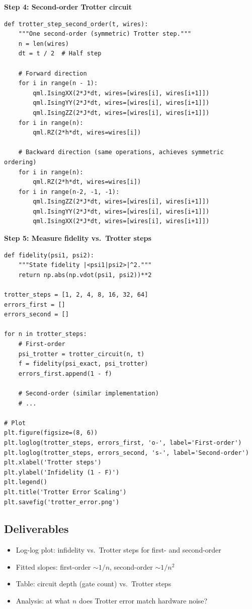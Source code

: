 \documentclass[11pt,a4paper]{article}
\begin{document}
\textbf{Step 4: Second-order Trotter circuit}
\begin{lstlisting}
def trotter_step_second_order(t, wires):
    """One second-order (symmetric) Trotter step."""
    n = len(wires)
    dt = t / 2  # Half step
    
    # Forward direction
    for i in range(n - 1):
        qml.IsingXX(2*J*dt, wires=[wires[i], wires[i+1]])
        qml.IsingYY(2*J*dt, wires=[wires[i], wires[i+1]])
        qml.IsingZZ(2*J*dt, wires=[wires[i], wires[i+1]])
    for i in range(n):
        qml.RZ(2*h*dt, wires=wires[i])
    
    # Backward direction (same operations, achieves symmetric ordering)
    for i in range(n):
        qml.RZ(2*h*dt, wires=wires[i])
    for i in range(n-2, -1, -1):
        qml.IsingZZ(2*J*dt, wires=[wires[i], wires[i+1]])
        qml.IsingYY(2*J*dt, wires=[wires[i], wires[i+1]])
        qml.IsingXX(2*J*dt, wires=[wires[i], wires[i+1]])
\end{lstlisting}

\textbf{Step 5: Measure fidelity vs.\ Trotter steps}
\begin{lstlisting}
def fidelity(psi1, psi2):
    """State fidelity |<psi1|psi2>|^2."""
    return np.abs(np.vdot(psi1, psi2))**2

trotter_steps = [1, 2, 4, 8, 16, 32, 64]
errors_first = []
errors_second = []

for n in trotter_steps:
    # First-order
    psi_trotter = trotter_circuit(n, t)
    f = fidelity(psi_exact, psi_trotter)
    errors_first.append(1 - f)
    
    # Second-order (similar implementation)
    # ...
    
# Plot
plt.figure(figsize=(8, 6))
plt.loglog(trotter_steps, errors_first, 'o-', label='First-order')
plt.loglog(trotter_steps, errors_second, 's-', label='Second-order')
plt.xlabel('Trotter steps')
plt.ylabel('Infidelity (1 - F)')
plt.legend()
plt.title('Trotter Error Scaling')
plt.savefig('trotter_error.png')
\end{lstlisting}

\subsection*{Deliverables}
\begin{itemize}
    \item[\checkmark] Log-log plot: infidelity vs.\ Trotter steps for first- and second-order
    \item[\checkmark] Fitted slopes: first-order $\sim 1/n$, second-order $\sim 1/n^2$
    \item[\checkmark] Table: circuit depth (gate count) vs.\ Trotter steps
    \item[\checkmark] Analysis: at what $n$ does Trotter error match hardware noise?
\end{itemize}
\end{document}
